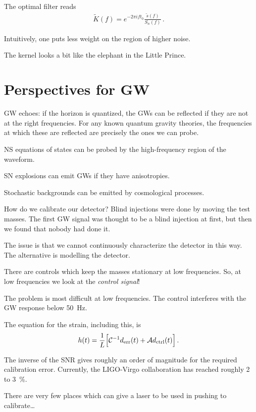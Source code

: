 \documentclass[main.tex]{subfiles}
\begin{document}
The optimal filter reads 
%
\begin{align}
\widetilde{K}(f) = e^{-2 \pi i f t_0 } \frac{\widetilde{s}(f)}{S_n(f)}
\,.
\end{align}

Intuitively, one puts less weight on the region of higher noise. 

The kernel looks a bit like the elephant in the Little Prince. 

\section{Perspectives for GW}

GW echoes: if the horizon is quantized, the GWs can be reflected if they are not at the right frequencies. 
For any known quantum gravity theories, the frequencies at which these are reflected are precisely the ones we can probe. 

NS equations of states can be probed by the high-frequency region of the waveform. 

SN explosions can emit GWs if they have anisotropies. 

Stochastic backgrounds can be emitted by cosmological processes. 

How do we calibrate our detector? 
Blind injections were done by moving the test masses. 
The first GW signal was thought to be a blind injection at first, but then we found that nobody had done it. 

The issue is that we cannot continuously characterize the detector in this way. 
The alternative is modelling the detector. 

There are controls which keep the masses stationary at low frequencies. 
So, at low frequencies we look at the \emph{control signal}! 

The problem is most difficult at low frequencies. 
The control interferes with the GW response below \SI{50}{Hz}. 

The equation for the strain, including this, is 
%
\begin{align}
h(t) = \frac{1}{L} \qty[\mathcal{C}^{-1} d _{\text{err}}(t) + \mathcal{A} d _{\text{ctrl}}(t)]
\,.
\end{align}

The inverse of the SNR gives roughly an order of magnitude for the required calibration error. 
Currently, the LIGO-Virgo collaboration has reached roughly 2 to \SI{3}{\percent}.

There are very few places which can give a laser to be used in pushing to calibrate\dots
\end{document}
